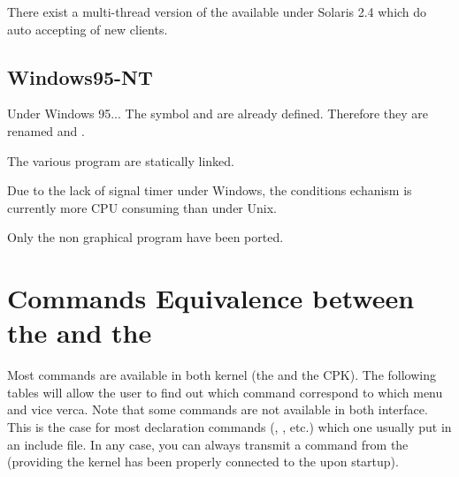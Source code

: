 There exist a multi-thread version of the \OPRSS{} available under Solaris 2.4
which do auto accepting of new \CPK{} clients.

\section{Windows95-NT}

Under Windows 95... The  symbol  and 
are already defined. Therefore they are renamed  and
.

The various program are statically linked.

Due to the lack of signal timer under Windows, the conditions echanism is
currently more CPU consuming than under Unix.

Only the non graphical program have been ported.

\chapter{Commands Equivalence between the \CPK{} and the \XPK{}}

Most commands are available in both kernel (the \XPK{} and the CPK{}). The
following tables will allow the user to find out which command correspond to
which menu and vice verca. Note that some commands are not available in both
interface. This is the case for most declaration commands (,
, etc.) which one usually put in an include file. In any case, you
can always transmit a command from the \OPRSS{} (providing the kernel has
been properly connected to the \OPRSS{} upon startup).

